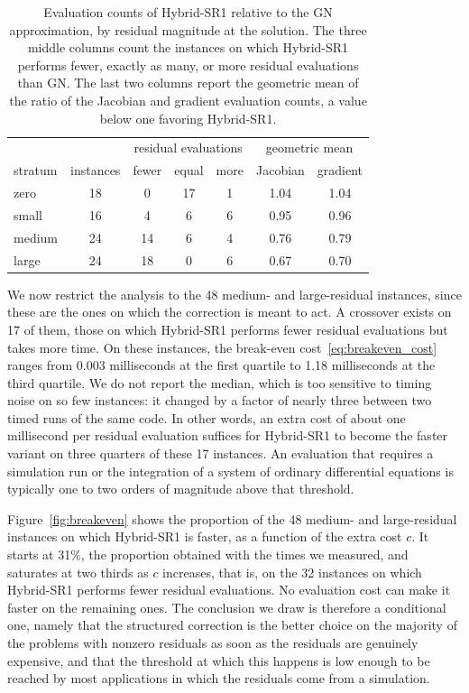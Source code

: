 \documentclass{article}
\numberwithin{equation}{section}
\theoremstyle{plain}
\begin{document}
\begin{table}[htbp]
	\centering
	\caption{Evaluation counts of Hybrid-SR1 relative to the GN approximation, by residual magnitude at the solution. The three middle columns count the instances on which Hybrid-SR1 performs fewer, exactly as many, or more residual evaluations than GN. The last two columns report the geometric mean of the ratio of the Jacobian and gradient evaluation counts, a value below one favoring Hybrid-SR1.}\label{tab:evaluation_ratios}
	\begin{tabular}{lcccccc}
		\hline
		& & \multicolumn{3}{c}{residual evaluations} & \multicolumn{2}{c}{geometric mean} \\
		stratum & instances & fewer & equal & more & Jacobian & gradient \\
		\hline 
		zero   & 18 &  0 & 17 & 1 & 1.04 & 1.04 \\
		small  & 16 &  4 &  6 & 6 & 0.95 & 0.96 \\
		medium & 24 & 14 &  6 & 4 & 0.76 & 0.79 \\
		large  & 24 & 18 &  0 & 6 & 0.67 & 0.70 \\
		\hline
	\end{tabular}

\end{table}

We now restrict the analysis to the 48 medium- and large-residual instances, since these are the ones on which the correction is meant to act. A crossover exists on 17 of them, those on which Hybrid-SR1 performs fewer residual evaluations but takes more time. On these instances, the break-even cost~\eqref{eq:breakeven_cost} ranges from 0.003 milliseconds at the first quartile to 1.18 milliseconds at the third quartile. We do not report the median, which is too sensitive to timing noise on so few instances: it changed by a factor of nearly three between two timed runs of the same code. In other words, an extra cost of about one millisecond per residual evaluation suffices for Hybrid-SR1 to become the faster variant on three quarters of these 17 instances. An evaluation that requires a simulation run or the integration of a system of ordinary differential equations is typically one to two orders of magnitude above that threshold.

Figure~\ref{fig:breakeven} shows the proportion of the 48 medium- and large-residual instances on which Hybrid-SR1 is faster, as a function of the extra cost $c$. It starts at 31\%, the proportion obtained with the times we measured, and saturates at two thirds as $c$ increases, that is, on the 32 instances on which Hybrid-SR1 performs fewer residual evaluations. No evaluation cost can make it faster on the remaining ones. The conclusion we draw is therefore a conditional one, namely that the structured correction is the better choice on the majority of the problems with nonzero residuals as soon as the residuals are genuinely expensive, and that the threshold at which this happens is low enough to be reached by most applications in which the residuals come from a simulation.
\end{document}
